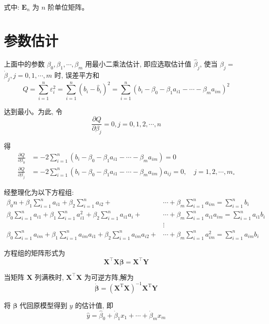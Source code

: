 \documentclass[a4paper,12pt]{article}
\begin{document}
式中: $\boldsymbol{E}_{n}$ 为 $n$ 阶单位矩阵。

\section{参数估计}
上面中的参数 $\beta_{0}, \beta_{1}, \cdots, \beta_{m}$ 用最小二乘法估计, 即应选取估计值 $\hat{\beta}_{j}$, 使当 $\beta_{j}=$ $\dot{\beta}_{j}, j=0,1, \cdots, m$ 时, 误差平方和
$$
Q=\sum_{i=1}^{n} \varepsilon_{i}^{2}=\sum_{i=1}^{n}\left(b_{i}-\hat{b}_{i}\right)^{2}=\sum_{i=1}^{n}\left(b_{i}-\beta_{0}-\beta_{1} a_{i 1}-\cdots-\beta_{m} a_{i m}\right)^{2}
$$

达到最小。为此, 令
$$
\frac{\partial Q}{\partial \beta_{j}}=0, j=0,1,2, \cdots, n
$$

得
\begin{align*}
	\frac{\partial Q}{\partial \beta_{0}}&=-2 \sum_{i=1}^{n}\left(b_{i}-\beta_{0}-\beta_{1} a_{i 1}-\cdots-\beta_{m} a_{i m}\right)=0 \\
	\frac{\partial Q}{\partial \beta_{j}}&=-2 \sum_{i=1}^{n}\left(b_{i}-\beta_{0}-\beta_{1} a_{i 1}-\cdots-\beta_{m} a_{i m}\right) a_{i j}=0, \quad j=1,2, \cdots, m_{\circ}
\end{align*}

经整理化为以下方程组:
\begin{align*}
	\beta_{0} n+\beta_{1} \sum_{i=1}^{n} a_{i 1}+\beta_{2} \sum_{i=1}^{n} a_{i 2}+&\cdots+\beta_{m} \sum_{i=1}^{n} a_{i m}=\sum_{i=1}^{n} b_{i} \\
	\beta_{0} \sum_{i=1}^{n} a_{i 1}+\beta_{1} \sum_{i=1}^{n} a_{i 1}^{2}+\beta_{2} \sum_{i=1}^{n} a_{i 1} a_{i}+&\cdots+\beta_{m} \sum_{i=1}^{n} a_{i 1} a_{i m}=\sum_{i=1}^{n} a_{i 1} b_{i} \\
	&\vdots\\
	\beta_{0} \sum_{i=1}^{n} a_{i m}+\beta_{1} \sum_{i=1}^{n} a_{i m} a_{i 1}+\beta_{2} \sum_{i=1}^{n} a_{i m} a_{i 2}+&\cdots+\beta_{m} \sum_{i=1}^{n} a_{i m}^{2}=\sum_{i=1}^{n} a_{i m} b_{i}
\end{align*}

方程组的矩阵形式为
$$
\boldsymbol{X}^{\top} \boldsymbol{X} \boldsymbol{\beta}=\boldsymbol{X}^{\top} \boldsymbol{Y}
$$

当矩阵 $\boldsymbol{X}$ 列满秩时, $\boldsymbol{X}^{\top} \boldsymbol{X}$ 为可逆方阵,解为
$$
\dot{\boldsymbol{\beta}}=\left(\boldsymbol{X}^{\mathrm{T}} \boldsymbol{X}\right)^{-1} \boldsymbol{X}^{\mathrm{T}} \boldsymbol{Y}
$$

将 $\boldsymbol{\beta}$ 代回原模型得到 $y$ 的估计值, 即
$$
\hat{y}=\hat{\beta}_{0}+\dot{\beta}_{1} x_{1}+\cdots+\dot{\beta}_{m} x_{m}
$$
\end{document}
